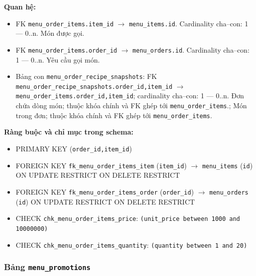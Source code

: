 \textbf{Quan hệ:}

\begin{itemize}

\item FK \texttt{menu\_order\_items.item\_id} $\rightarrow$ \texttt{menu\_items.id}. Cardinality cha--con: 1 — 0..n. Món được gọi.

\item FK \texttt{menu\_order\_items.order\_id} $\rightarrow$ \texttt{menu\_orders.id}. Cardinality cha--con: 1 — 0..n. Yêu cầu gọi món.

\item Bảng con \texttt{menu\_order\_recipe\_snapshots}: FK \texttt{menu\_order\_recipe\_snapshots.order\_id,item\_id} $\rightarrow$ \texttt{menu\_order\_items.order\_id,item\_id}; cardinality cha--con: 1 — 0..n. Đơn chứa dòng món; thuộc khóa chính và FK ghép tới \texttt{menu\_order\_items}.; Món trong đơn; thuộc khóa chính và FK ghép tới \texttt{menu\_order\_items}.

\end{itemize}

\textbf{Ràng buộc và chỉ mục trong schema:}

\begin{itemize}

\item PRIMARY KEY (\texttt{order\_id,item\_id})

\item FOREIGN KEY \texttt{fk\_menu\_order\_items\_item} (\texttt{item\_id}) $\rightarrow$ \texttt{menu\_items} (\texttt{id}) ON UPDATE RESTRICT ON DELETE RESTRICT

\item FOREIGN KEY \texttt{fk\_menu\_order\_items\_order} (\texttt{order\_id}) $\rightarrow$ \texttt{menu\_orders} (\texttt{id}) ON UPDATE RESTRICT ON DELETE RESTRICT

\item CHECK \texttt{chk\_menu\_order\_items\_price}: \texttt{(unit\_price between 1000 and 10000000)}

\item CHECK \texttt{chk\_menu\_order\_items\_quantity}: \texttt{(quantity between 1 and 20)}

\end{itemize}

\subsubsection{Bảng \texttt{menu\_promotions}}

